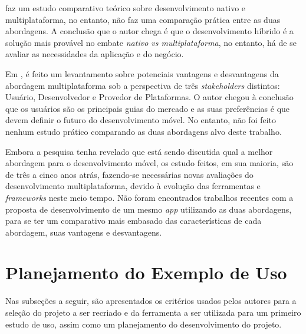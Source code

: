  faz um estudo comparativo teórico sobre desenvolvimento nativo e multiplataforma, no entanto,
não faz uma comparação prática entre as duas abordagens. A conclusão que o autor chega é que o desenvolvimento híbrido é a solução mais provável no embate 
\textit{nativo vs multiplataforma}, no entanto, há de se avaliar as necessidades da aplicação e do negócio.

Em , é feito um levantamento sobre potenciais vantagens e desvantagens da abordagem multiplataforma sob a 
perspectiva de três \textit{stakeholders} distintos: Usuário, Desenvolvedor e Provedor de Plataformas. O autor chegou à conclusão que os usuários são os principais
guias do mercado e as suas preferências é que devem definir o futuro do desenvolvimento móvel. No entanto, não foi feito nenhum estudo prático comparando
as duas abordagens alvo deste trabalho.

Embora a pesquisa tenha revelado que está sendo discutida qual a melhor abordagem para o desenvolvimento móvel, os estudo feitos, em sua maioria, são de três a cinco 
anos atrás, fazendo-se necessárias novas avaliações do desenvolvimento multiplataforma, devido à evolução das ferramentas e \textit{frameworks} neste meio tempo.
Não foram encontrados trabalhos recentes com a proposta de desenvolvimento de um mesmo \textit{app} utilizando as duas abordagens, para se ter um comparativo mais embasado das
características de cada abordagem, suas vantagens e desvantagens.
 
\begin{comment}
Falar que tem mt trabalho comparativo de nativo e cross, mas não refletem a atualidades, pois mudou muito em poucos anos.
e nao ha um estudo comparativo
tenho 3 plataformas, o cross surgiu como uma solucao, e queremos confirmar se eh mesmo uma solucao
da pra confiar nessa abordagem pra todos os desenvolvimentos de apps?    
\end{comment}

\section{Planejamento do Exemplo de Uso} \label{section:planejamentoestudodecaso}

Nas subseções a seguir, são apresentados os critérios usados pelos autores para a seleção do projeto a ser recriado e da ferramenta a ser utilizada para um primeiro estudo de uso, assim como um planejamento
do desenvolvimento do projeto.


